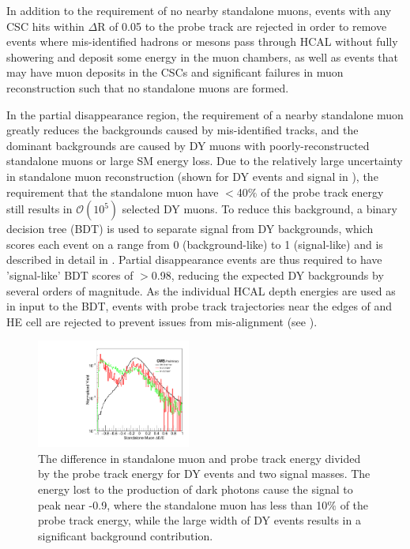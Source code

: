 In addition to the requirement of no nearby standalone muons, events with any CSC hits within $\Delta$R of 0.05 to the probe track are rejected in order to remove events where mis-identified hadrons or mesons pass through HCAL without fully showering and deposit some energy in the muon chambers, as well as events that may have muon deposits in the CSCs and significant failures in muon reconstruction such that no standalone muons are formed.

In the partial disappearance region, the requirement of a nearby standalone muon greatly reduces the backgrounds caused by mis-identified tracks, and the dominant backgrounds are caused by DY muons with poorly-reconstructed standalone muons or large SM energy loss.
Due to the relatively large uncertainty in standalone muon reconstruction (shown for DY events and signal in ), the requirement that the standalone muon have $<$40$\%$ of the probe track energy still results in $\mathcal{O}(10^{5})$ selected DY muons.
To reduce this background, a binary decision tree (BDT) is used to separate signal from DY backgrounds, which scores each event on a range from 0 (background-like) to 1 (signal-like) and is described in detail in .
Partial disappearance events are thus required to have 'signal-like' BDT scores of $>$0.98, reducing the expected DY backgrounds by several orders of magnitude.
As the individual HCAL depth energies are used as in input to the BDT, events with probe track trajectories near the edges of and HE cell are rejected to prevent issues from mis-alignment (see ).

\begin{figure}[htpb]
	\centering
	\includegraphics[width=0.45\textwidth]{figures/allEventsStandaloneMuondEoverE_stack.pdf}
	\caption[Standalone Muon Energy Differences]{The difference in standalone muon and probe track energy divided by the probe track energy for DY events and two signal masses. The energy lost to the production of dark photons cause the signal to peak near -0.9, where the standalone muon has less than 10$\%$ of the probe track energy, while the large width of DY events results in a significant background contribution.}
	\label{fig:staDEoverE}
\end{figure}

